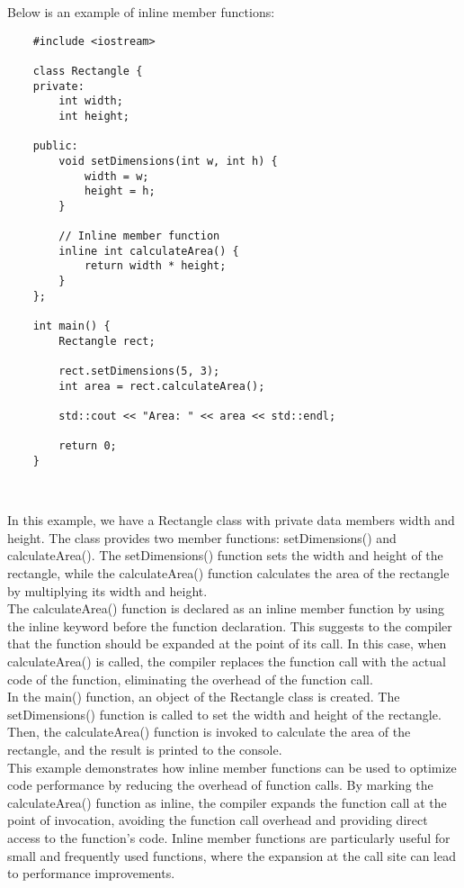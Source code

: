 \begin{solution}
    Below is an example of inline member functions: \\
    \horizontalline
    \begin{verbatim}
    #include <iostream>

    class Rectangle {
    private:
        int width;
        int height;
        
    public:
        void setDimensions(int w, int h) {
            width = w;
            height = h;
        }
        
        // Inline member function
        inline int calculateArea() {
            return width * height;
        }
    };
    
    int main() {
        Rectangle rect;
        
        rect.setDimensions(5, 3);
        int area = rect.calculateArea();
        
        std::cout << "Area: " << area << std::endl;
        
        return 0;
    }        
    \end{verbatim} \\
    \horizontalline

    In this example, we have a Rectangle class with private data members width and height. The class provides two member functions: setDimensions() and calculateArea(). The setDimensions() function sets the width 
    and height of the rectangle, while the calculateArea() function calculates the area of the rectangle by multiplying its width and height. \\

    \noindent The calculateArea() function is declared as an inline member function by using the inline keyword before the function declaration. This suggests to the compiler that the function should be expanded 
    at the point of its call. In this case, when calculateArea() is called, the compiler replaces the function call with the actual code of the function, eliminating the overhead of the function call. \\

    \noindent In the main() function, an object of the Rectangle class is created. The setDimensions() function is called to set the width and height of the rectangle. Then, the calculateArea() function is invoked 
    to calculate the area of the rectangle, and the result is printed to the console. \\

    \noindent This example demonstrates how inline member functions can be used to optimize code performance by reducing the overhead of function calls. By marking the calculateArea() function as inline, the compiler 
    expands the function call at the point of invocation, avoiding the function call overhead and providing direct access to the function's code. Inline member functions are particularly useful for small and frequently 
    used functions, where the expansion at the call site can lead to performance improvements. \\
\end{solution}

